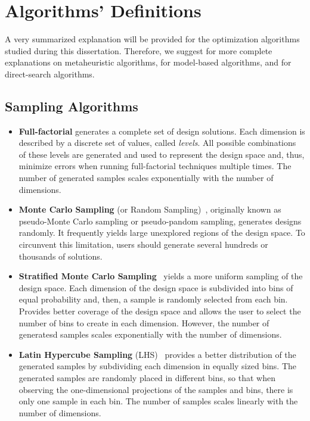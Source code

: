 \chapter{Algorithms' Definitions}
\label{appendix:AlgorithmsDefinitions}

A very summarized explanation will be provided for the optimization algorithms studied during this dissertation. Therefore, we suggest \cite{BlumRoli2003Metaheuristics,Glover2003Metaheuristics,Zhou2011} for more complete explanations on metaheuristic algorithms, \cite{Koziel2011} for model-based algorithms, and \cite{Conn2009,Custodio2010,Custodio2018} for direct-search algorithms.

\section{Sampling Algorithms} 
\begin{itemize}
\item \textbf{Full-factorial} generates a complete set of design solutions. Each dimension is described by a discrete set of values, called \textit{levels}. All possible combinations of these levels are generated and used to represent the design space and, thus, minimize errors when running full-factorial techniques multiple times. The number of generated samples scales exponentially with the number of dimensions. 
	
\item \textbf{Monte Carlo Sampling} (or Random Sampling)~\cite{Giunta2003DOE}, originally known as pseudo-Monte Carlo sampling or pseudo-pandom sampling, generates designs randomly. It frequently yields large unexplored regions of the design space. To circunvent this limitation, users should generate several hundreds or thousands of solutions.

\item \textbf{Stratified Monte Carlo Sampling}~\cite{Giunta2003DOE} yields a more uniform sampling of the design space. Each dimension of the design space is subdivided into bins of equal probability and, then, a sample is randomly selected from each bin. Provides better coverage of the design space and allows the user to select the number of bins to create in each dimension. However, the number of generatesd samples scales exponentially with the number of dimensions.

\item \textbf{Latin Hypercube Sampling} (LHS)~\cite{Giunta2003DOE} provides a better distribution of the generated samples by subdividing each dimension in equally sized bins. The generated samples are randomly placed in different bins, so that when observing the one-dimensional projections of the samples and bins, there is only one sample in each bin. The number of samples scales linearly with the number of dimensions.

\end{itemize}

